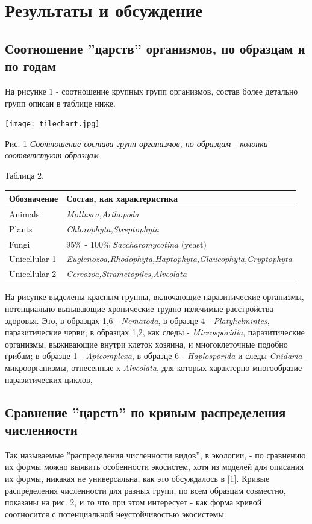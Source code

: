 \documentclass[a4paper]{article}
\begin{document}
\section{Результаты и обсуждение}

\subsection*{Соотношение ''царств'' организмов, по образцам и по годам}

На рисунке 1 - соотношение крупных групп организмов, состав более детально групп описан в таблице ниже.

\texttt{[image: tilechart.jpg]}

Рис. 1 \textit{Соотношение состава групп организмов, по образцам - колонки соответстуют образцам}

Таблица 2.

\begin{tabular}{ll}
\hline
Обозначение&Состав, как характеристика\\
\hline
Animals&\textit{Mollusca,Arthopoda}\\
Plants&\textit{Chlorophyta,Streptophyta}\\
Fungi&95\% - 100\% \textit{Saccharomycotina} (yeast)\\
Unicellular 1&\textit{Euglenozoa,Rhodophyta,Haptophyta,Glaucophyta,Cryptophyta}\\
Unicellular 2&\textit{Cercozoa,Strametopiles,Alveolata}\\
\hline
\end{tabular}

На рисунке выделены красным группы, включающие паразитические организмы, потенциально вызывающие хронические трудно излечимые расстройства здоровья. Это,
в образцах 1,6 - \textit{Nematoda}, в образце 4 - \textit{Platyhelmintes}, паразитические черви; в образцах 1,2, как следы - \textit{Microsporidia}, паразитические организмы, выживающие внутри клеток хозяина, и многоклеточные подобно грибам; в образце 1 - \textit{Apicomplexa}, в образце 6 - \textit{Haplosporida} и следы \textit{Cnidaria} - микроорганизмы, отнесенные к \textit{Alveolata}, для которых характерно многообразие паразитических циклов,

\subsection*{Сравнение ''царств'' по кривым распределения численности}

Так называемые ''распределения численности видов'', в экологии, - по сравнению их формы можно выявить особенности экосистем, хотя из моделей для описания их формы, никакая не универсальна, как это обсуждалось в [1]. Кривые распределения численности для разных групп, по всем образцам совместно, показаны на рис. 2, и то что при этом интересует - как форма кривой соотносится с потенциальной неустойчивостью экосистемы.
\end{document}
